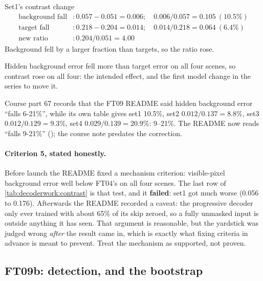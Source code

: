 \begin{worked}[label={we:decoderwork:contrast}]{Set1's contrast change}
\begin{align*}
\text{background fall} &: 0.057-0.051 = 0.006;\quad 0.006/0.057 = 0.105\ (10.5\%)\\
\text{target fall} &: 0.218-0.204 = 0.014;\quad 0.014/0.218 = 0.064\ (6.4\%)\\
\text{new ratio} &: 0.204/0.051 = 4.00
\end{align*}
Background fell by a larger fraction than targets, so the ratio rose.
\end{worked}

Hidden background error fell more than target error on all four scenes, so contrast rose on all four: the
intended effect, and the first model change in the series to move it.

\begin{sourcenote}[: ``6--21\%'' or ``9--21\%'']
Course part 67 records that the FT09 README said hidden background error ``falls 6-21\%'', while its own table
gives set1 10.5\%, set2 $0.012/0.137=8.8\%$, set3 $0.012/0.129=9.3\%$, set4 $0.029/0.139=20.9\%$: 9--21\%. The
README now reads ``falls 9-21\%'' (); the
course note predates the correction.
\end{sourcenote}

\paragraph{Criterion 5, stated honestly.} Before launch the README fixed a mechanism criterion: visible-pixel
background error well below FT04's on all four scenes. The last row of \cref{tab:decoderwork:contrast} is that
test, and it \textbf{failed}: set1 got much worse (0.056 to 0.176). Afterwards the README recorded a caveat: the
progressive decoder only ever trained with about 65\% of its skip zeroed, so a fully unmasked input is outside
anything it has seen. That argument is reasonable, but the yardstick was judged wrong \emph{after} the result came
in, which is exactly what fixing criteria in advance is meant to prevent. Treat the mechanism as supported, not
proven.

\subsection{FT09b: detection, and the bootstrap}

